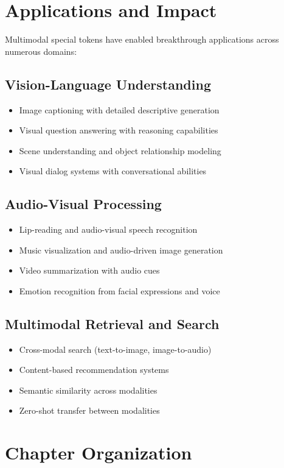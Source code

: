 \section{Applications and Impact}

Multimodal special tokens have enabled breakthrough applications across numerous domains:

\subsection{Vision-Language Understanding}
\begin{itemize}
\item Image captioning with detailed descriptive generation
\item Visual question answering with reasoning capabilities
\item Scene understanding and object relationship modeling
\item Visual dialog systems with conversational abilities
\end{itemize}

\subsection{Audio-Visual Processing}
\begin{itemize}
\item Lip-reading and audio-visual speech recognition
\item Music visualization and audio-driven image generation
\item Video summarization with audio cues
\item Emotion recognition from facial expressions and voice
\end{itemize}

\subsection{Multimodal Retrieval and Search}
\begin{itemize}
\item Cross-modal search (text-to-image, image-to-audio)
\item Content-based recommendation systems
\item Semantic similarity across modalities
\item Zero-shot transfer between modalities
\end{itemize}

\section{Chapter Organization}

